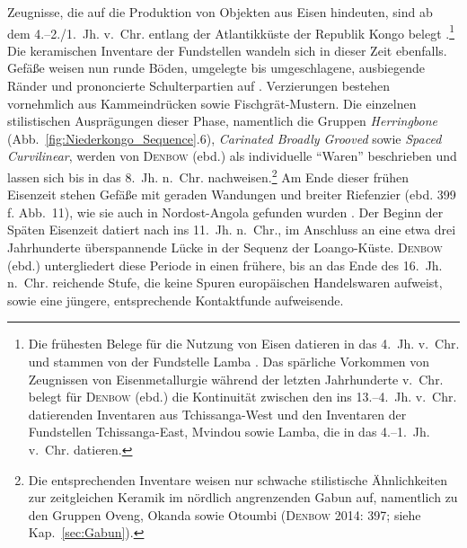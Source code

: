 Zeugnisse, die auf die Produktion von Objekten aus Eisen hindeuten, sind ab dem 4.--2./1.~Jh. v.~Chr. entlang der Atlantikküste der Republik Kongo belegt \parencites[394]{Denbow.2012}[106--135]{Denbow.2014}.\footnote{Die frühesten Belege für die Nutzung von Eisen datieren in das 4.~Jh. v.~Chr. und stammen von der Fundstelle Lamba \parencite[394]{Denbow.2012}. Das spärliche Vorkommen von Zeugnissen von Eisenmetallurgie während der letzten Jahrhunderte v.~Chr. belegt für \textsc{Denbow} (ebd.) die Kontinuität zwischen den ins 13.--4.~Jh. v.~Chr. datierenden Inventaren aus Tchissanga-West und den Inventaren der Fundstellen Tchissanga-East, Mvindou sowie Lamba, die in das 4.--1.~Jh. v.~Chr. datieren.} Die keramischen Inventare der Fundstellen wandeln sich in dieser Zeit ebenfalls. Gefäße weisen nun runde Böden, umgelegte bis umgeschlagene, ausbiegende Ränder und prononcierte Schulterpartien auf \parencite[396\,f.]{Denbow.2012}. Verzierungen bestehen vornehmlich aus Kammeindrücken sowie Fischgrät-Mustern. Die einzelnen stilistischen Ausprägungen dieser Phase, namentlich die Gruppen \textit{Herringbone} (Abb.~\ref{fig:Niederkongo_Sequence}.6), \textit{Carinated Broadly Grooved} sowie \textit{Spaced Curvilinear}, werden von \textsc{Denbow} (ebd.) als individuelle \enquote{Waren} beschrieben und lassen sich bis in das 8.~Jh. n.~Chr. nachweisen.\footnote{Die entsprechenden Inventare weisen nur schwache stilistische Ähnlichkeiten zur zeitgleichen Keramik im nördlich angrenzenden Gabun auf, namentlich zu den Gruppen Oveng, Okanda sowie Otoumbi (\textsc{Denbow} 2014: 397; siehe Kap.~\ref{sec:Gabun}).} Am Ende dieser frühen Eisenzeit stehen Gefäße mit geraden Wandungen und breiter Riefenzier (ebd. 399\,f. Abb.~11), wie sie auch in Nordost-Angola gefunden wurden \parencite[201 No. 1--4, 7]{Clark.1968b}. Der Beginn der Späten Eisenzeit datiert nach \textcite[402--404]{Denbow.2012} ins 11.~Jh. n.~Chr., im Anschluss an eine etwa drei Jahrhunderte überspannende Lücke in der Sequenz der Loango-Küste. \textsc{Denbow} (ebd.) untergliedert diese Periode in einen frühere, bis an das Ende des 16.~Jh. n.~Chr. reichende Stufe, die keine Spuren europäischen Handelswaren aufweist, sowie eine jüngere, entsprechende Kontaktfunde aufweisende.

